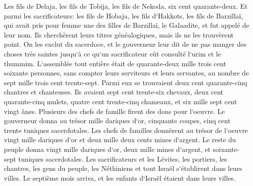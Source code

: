 \verse Les fils de Delaja, les fils de Tobija, les fils de Nekoda, six cent quarante-deux. 
\verse Et parmi les sacrificateurs: les fils de Hobaja, les fils d`Hakkots, les fils de Barzillaï, qui avait pris pour femme une des filles de Barzillaï, le Galaadite, et fut appelé de leur nom. 
\verse Ils cherchèrent leurs titres généalogiques, mais ils ne les trouvèrent point. On les exclut du sacerdoce, 
\verse et le gouverneur leur dit de ne pas manger des choses très saintes jusqu`à ce qu`un sacrificateur eût consulté l`urim et le thummim. 
\verse L`assemblée tout entière était de quarante-deux mille trois cent soixante personnes, 
\verse sans compter leurs serviteurs et leurs servantes, au nombre de sept mille trois cent trente-sept. Parmi eux se trouvaient deux cent quarante-cinq chantres et chanteuses. 
\verse Ils avaient sept cent trente-six chevaux, deux cent quarante-cinq mulets, 
\verse quatre cent trente-cinq chameaux, et six mille sept cent vingt ânes. 
\verse Plusieurs des chefs de famille firent des dons pour l`oeuvre. Le gouverneur donna au trésor mille dariques d`or, cinquante coupes, cinq cent trente tuniques sacerdotales. 
\verse Les chefs de familles donnèrent au trésor de l`oeuvre vingt mille dariques d`or et deux mille deux cents mines d`argent. 
\verse Le reste du peuple donna vingt mille dariques d`or, deux mille mines d`argent, et soixante-sept tuniques sacerdotales. 
\verse Les sacrificateurs et les Lévites, les portiers, les chantres, les gens du peuple, les Néthiniens et tout Israël s`établirent dans leurs villes. Le septième mois arriva, et les enfants d`Israël étaient dans leurs villes. 

\chapter{}

